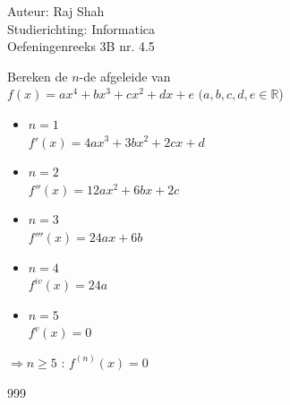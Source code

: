 \documentclass[a4paper]{article}
\begin{document}
  
\noindent \large Auteur: Raj Shah \\
\noindent \large Studierichting: Informatica\\
\noindent \large Oefeningenreeks 3B nr. 4.5\\

\medskip

\normalsize
Bereken de $n$-de afgeleide van \\

$f(x) = ax^4 + bx^3 + cx^2 +dx + e$  $(a, b, c, d, e \in \mathbb{R}$)\\
\begin{itemize}
	\item $n = 1$\\

$f'(x) = 4ax^3 + 3bx^2 +2cx + d$\\

	\item $n = 2$\\

$f''(x) = 12ax^2 +6bx + 2c$\\

	\item $n = 3$\\
	
$f'''(x) = 24ax + 6b$\\

	\item $n = 4$\\

$f^{iv}(x) = 24a$\\

	\item $n = 5$\\
	
$f^{v}(x) = 0$\\

\end{itemize}

$\Rightarrow n \geq 5$ : $f^{(n)} (x) = 0$
 





\begin{thebibliography}{999}
\end{thebibliography}
\end{document}
